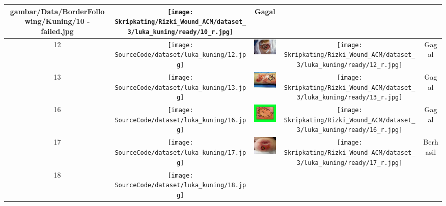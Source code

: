 \begin{longtable}[width = 8cm]{| c | c | c | c | c |}
        {gambar/Data/BorderFollowing/Kuning/10 - failed.jpg} &
        \texttt{[image: Skripkating/Rizki\_Wound\_ACM/dataset\_3/luka\_kuning/ready/10\_r.jpg]} &
        Gagal
        \\
        \hline
        12 &
        \texttt{[image: SourceCode/dataset/luka\_kuning/12.jpg]} &
        \includegraphics[keepaspectratio, width=2cm]
        {gambar/Data/BorderFollowing/Kuning/12 - failed.jpg} &
        \texttt{[image: Skripkating/Rizki\_Wound\_ACM/dataset\_3/luka\_kuning/ready/12\_r.jpg]} &
        Gagal
        \\
        \hline
        13 &
        \texttt{[image: SourceCode/dataset/luka\_kuning/13.jpg]} &
        \includegraphics[keepaspectratio, width=2cm]
        {gambar/Data/BorderFollowing/Kuning/13 - failed.jpg} &
        \texttt{[image: Skripkating/Rizki\_Wound\_ACM/dataset\_3/luka\_kuning/ready/13\_r.jpg]} &
        Gagal
        \\
        \hline
        16 &
        \texttt{[image: SourceCode/dataset/luka\_kuning/16.jpg]} &
        \includegraphics[keepaspectratio, width=2cm]
        {gambar/Data/BorderFollowing/Kuning/16 - failed.jpg} &
        \texttt{[image: Skripkating/Rizki\_Wound\_ACM/dataset\_3/luka\_kuning/ready/16\_r.jpg]} &
        Gagal
        \\
        \hline
        17 &
        \texttt{[image: SourceCode/dataset/luka\_kuning/17.jpg]} &
        \includegraphics[keepaspectratio, width=2cm]
        {gambar/Data/BorderFollowing/Kuning/17 - sukses.jpg} &
        \texttt{[image: Skripkating/Rizki\_Wound\_ACM/dataset\_3/luka\_kuning/ready/17\_r.jpg]} &
        Berhasil
        \\
        \hline
        18 &
        \texttt{[image: SourceCode/dataset/luka\_kuning/18.jpg]} &

\end{longtable}
